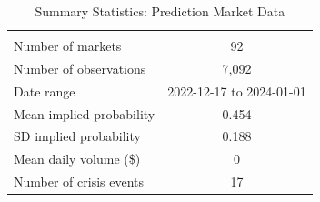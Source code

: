 
\begin{table}[htbp]
\centering
\caption{Summary Statistics: Prediction Market Data}
\label{tab:summary}
\begin{tabular}{lc}
\hline\hline
& \\
Number of markets & 92 \\
Number of observations & 7,092 \\
Date range & 2022-12-17 to 2024-01-01 \\
Mean implied probability & 0.454 \\
SD implied probability & 0.188 \\
Mean daily volume (\$) & 0 \\
Number of crisis events & 17 \\
\hline\hline
\end{tabular}
\end{table}
